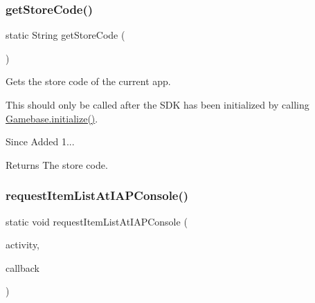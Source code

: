 \subsubsection{\texorpdfstring{get\+Store\+Code()}{getStoreCode()}}
{\footnotesize\ttfamily static String get\+Store\+Code (\begin{DoxyParamCaption}{ }\end{DoxyParamCaption})\hspace{0.3cm}{\ttfamily [static]}}



Gets the store code of the current app. 

This should only be called after the S\+DK has been initialized by calling \hyperlink{classcom_1_1toast_1_1android_1_1gamebase_1_1_gamebase_a1b2d26183c219ab1ef840a95af71bd88}{Gamebase.\+initialize()}.

\begin{DoxySince}{Since}
Added 1... 
\end{DoxySince}
\begin{DoxyReturn}{Returns}
The store code. 
\end{DoxyReturn}
\mbox{\label{classcom_1_1toast_1_1android_1_1gamebase_1_1_gamebase_1_1_purchase_a541b8b3f42c728a330ed1d4b6e3bc9af}} 
\subsubsection{\texorpdfstring{request\+Item\+List\+At\+I\+A\+P\+Console()}{requestItemListAtIAPConsole()}}
{\footnotesize\ttfamily static void request\+Item\+List\+At\+I\+A\+P\+Console (\begin{DoxyParamCaption}\item[{@Non\+Null final Activity}]{activity,  }\item[{@Non\+Null final \hyperlink{interfacecom_1_1toast_1_1android_1_1gamebase_1_1_gamebase_data_callback}{Gamebase\+Data\+Callback}$<$ List$<$ \hyperlink{classcom_1_1toast_1_1android_1_1gamebase_1_1base_1_1purchase_1_1_purchasable_item}{Purchasable\+Item} $>$$>$}]{callback }\end{DoxyParamCaption})\hspace{0.3cm}{\ttfamily [static]}}



